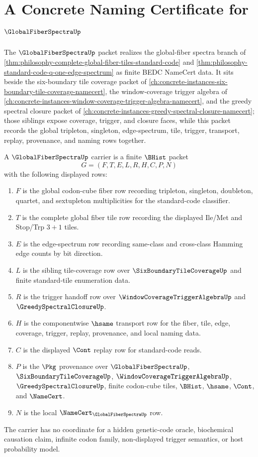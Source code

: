 \chapter{A Concrete Naming Certificate for $\GlobalFiberSpectraUp$}
\label{ch:concrete-instances-global-fiber-spectra-namecert}

The $\GlobalFiberSpectraUp$ packet realizes the global-fiber spectra branch of \autoref{thm:philosophy-complete-global-fiber-tiles-standard-code} and \autoref{thm:philosophy-standard-code-q-one-edge-spectrum} as finite BEDC NameCert data. It sits beside the six-boundary tile coverage packet of \autoref{ch:concrete-instances-six-boundary-tile-coverage-namecert}, the window-coverage trigger algebra of \autoref{ch:concrete-instances-window-coverage-trigger-algebra-namecert}, and the greedy spectral closure packet of \autoref{ch:concrete-instances-greedy-spectral-closure-namecert}; those siblings expose coverage, trigger, and closure faces, while this packet records the global tripleton, singleton, edge-spectrum, tile, trigger, transport, replay, provenance, and naming rows together.

\begin{definition}
\label{def:global-fiber-spectra-carrier}
A $\GlobalFiberSpectraUp$ carrier is a finite $\BHist$ packet
$$
G=(F,T,E,L,R,H,C,P,N)
$$
with the following displayed rows:
\begin{enumerate}
\item $F$ is the global codon-cube fiber row recording tripleton, singleton, doubleton, quartet, and sextupleton multiplicities for the standard-code classifier.
\item $T$ is the complete global fiber tile row recording the displayed Ile/Met and Stop/Trp $3+1$ tiles.
\item $E$ is the edge-spectrum row recording same-class and cross-class Hamming edge counts by bit direction.
\item $L$ is the sibling tile-coverage row over $\SixBoundaryTileCoverageUp$ and finite standard-tile enumeration data.
\item $R$ is the trigger handoff row over $\WindowCoverageTriggerAlgebraUp$ and $\GreedySpectralClosureUp$.
\item $H$ is the componentwise $\hsame$ transport row for the fiber, tile, edge, coverage, trigger, replay, provenance, and local naming data.
\item $C$ is the displayed $\Cont$ replay row for standard-code reads.
\item $P$ is the $\Pkg$ provenance over $\GlobalFiberSpectraUp$, $\SixBoundaryTileCoverageUp$, $\WindowCoverageTriggerAlgebraUp$, $\GreedySpectralClosureUp$, finite codon-cube tiles, $\BHist$, $\hsame$, $\Cont$, and $\NameCert$.
\item $N$ is the local $\NameCert_{\GlobalFiberSpectraUp}$ row.
\end{enumerate}
The carrier has no coordinate for a hidden genetic-code oracle, biochemical causation claim, infinite codon family, non-displayed trigger semantics, or host probability model.
\end{definition}


